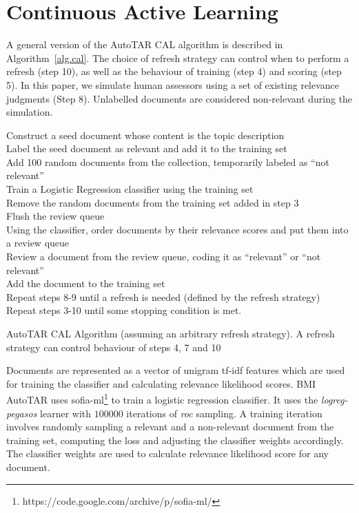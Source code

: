 \label{chap:rel}


\section{Continuous Active Learning}

A general version of the AutoTAR CAL algorithm is described in
Algorithm~\ref{alg.cal}.  The choice of refresh strategy can control when to
perform a refresh (step 10), as well as the behaviour of training (step 4) and
scoring (step 5). In this paper, we simulate human assessors using a set of
existing relevance judgments (Step 8). Unlabelled documents are considered
non-relevant during the simulation.

\begin{algorithm}[]
Construct a seed document whose content is the topic description \\
Label the seed document as relevant and add it to the training set \\
Add 100 random documents from the collection, temporarily labeled as ``not
relevant'' \\
Train a Logistic Regression classifier using the training set \\
Remove the random documents from the training set added in step 3 \\
Flush the review queue \\
Using the classifier, order documents by their relevance scores and put them
into a review queue \\ Review a document from the review queue, coding it as
``relevant'' or ``not relevant'' \\
Add the document to the training set \\
Repeat steps 8-9 until a refresh is needed (defined by the refresh strategy) \\
Repeat steps 3-10 until some stopping condition is met.
\caption{AutoTAR CAL Algorithm (assuming an arbitrary refresh strategy). A refresh
strategy can control behaviour of steps 4, 7 and 10}
\label{alg.cal}
\end{algorithm}

Documents are represented as a vector of unigram tf-idf features which are used
for training the classifier and calculating relevance likelihood scores. BMI
AutoTAR uses sofia-ml\footnote{https://code.google.com/archive/p/sofia-ml/}
\cite{sculley2010combined} to train a logistic regression classifier. It uses
the \textit{logreg-pegasos} learner with $100000$ iterations of \textit{roc}
sampling. A training iteration involves randomly sampling a relevant and a
non-relevant document from the training set, computing the loss and adjusting
the classifier weights accordingly. The classifier weights are used to calculate
relevance likelihood score for any document.

